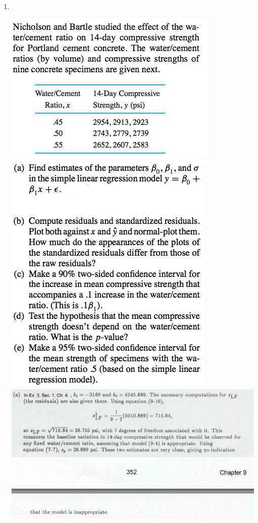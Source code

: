 \documentclass{article}\usepackage{graphicx, color}
\providecommand{\q}{$\quad$ \newline}
\numberwithin{equation}{section}
\begin{document}
\begin{flushleft}
\begin{enumerate}[1. ]
\item  \q

 \includegraphics{../../fig/h11p2-1.png}
 \includegraphics{../../fig/h11p2-2.png}
 \includegraphics{../../fig/h11p2sol1.png}

\end{enumerate}
\end{flushleft}
\end{document}

